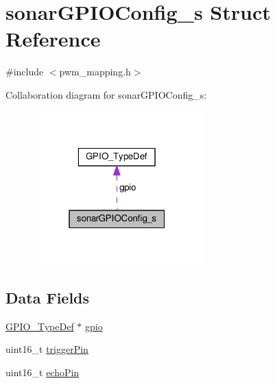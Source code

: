 \hypertarget{structsonarGPIOConfig__s}{\section{sonar\+G\+P\+I\+O\+Config\+\_\+s Struct Reference}
\label{structsonarGPIOConfig__s}
}


{\ttfamily \#include $<$pwm\+\_\+mapping.\+h$>$}



Collaboration diagram for sonar\+G\+P\+I\+O\+Config\+\_\+s\+:\nopagebreak
\begin{figure}[H]
\begin{center}
\leavevmode
\includegraphics[width=184pt]{structsonarGPIOConfig__s__coll__graph}
\end{center}
\end{figure}
\subsection*{Data Fields}
\begin{DoxyCompactItemize}
\item 
\hyperlink{structGPIO__TypeDef}{G\+P\+I\+O\+\_\+\+Type\+Def} $\ast$ \hyperlink{structsonarGPIOConfig__s_a5dd2f9efeb7270cabe20cdbd6ad8d95b}{gpio}
\item 
uint16\+\_\+t \hyperlink{structsonarGPIOConfig__s_a33c87f6ec63ad4b2e4ac98d0957d6bec}{trigger\+Pin}
\item 
uint16\+\_\+t \hyperlink{structsonarGPIOConfig__s_a23ef1a41007db03133beb98c0ccb3fa7}{echo\+Pin}
\end{DoxyCompactItemize}


